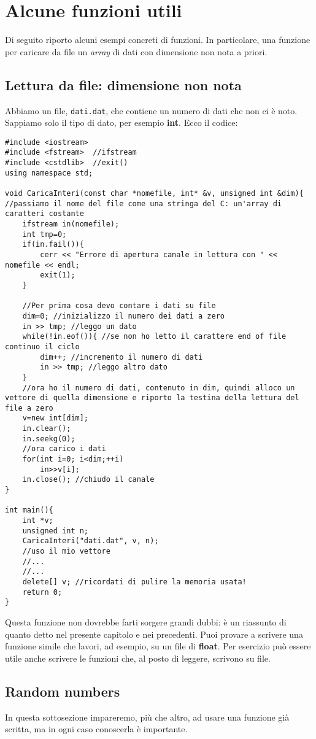 \section{Alcune funzioni utili}
Di seguito riporto alcuni esempi concreti di funzioni. In particolare, una funzione per caricare da file un \emph{array} di dati con dimensione non nota a priori.
\subsection{Lettura da file: dimensione non nota}
Abbiamo un file, \verb|dati.dat|, che contiene un numero di dati che non ci è noto. Sappiamo solo il tipo di dato, per esempio \textbf{int}. Ecco il codice:
\begin{lstlisting}
#include <iostream>
#include <fstream>	//ifstream
#include <cstdlib>	//exit()
using namespace std;

void CaricaInteri(const char *nomefile, int* &v, unsigned int &dim){ //passiamo il nome del file come una stringa del C: un'array di caratteri costante
	ifstream in(nomefile);
	int tmp=0; 
	if(in.fail()){
		cerr << "Errore di apertura canale in lettura con " << nomefile << endl;
		exit(1);
	}
	
	//Per prima cosa devo contare i dati su file
	dim=0; //inizializzo il numero dei dati a zero
	in >> tmp; //leggo un dato
	while(!in.eof()){ //se non ho letto il carattere end of file continuo il ciclo
		dim++; //incremento il numero di dati
		in >> tmp; //leggo altro dato
	}
	//ora ho il numero di dati, contenuto in dim, quindi alloco un vettore di quella dimensione e riporto la testina della lettura del file a zero
	v=new int[dim];
	in.clear();
	in.seekg(0);
	//ora carico i dati
	for(int i=0; i<dim;++i)
		in>>v[i];
	in.close(); //chiudo il canale	
}

int main(){
	int *v;
	unsigned int n;
	CaricaInteri("dati.dat", v, n);
	//uso il mio vettore
	//...
	//...
	delete[] v; //ricordati di pulire la memoria usata!
	return 0;
}
\end{lstlisting}

Questa funzione non dovrebbe farti sorgere grandi dubbi: è un riassunto di quanto detto nel presente capitolo e nei precedenti. Puoi provare a scrivere una funzione simile che lavori, ad esempio, su un file di \textbf{float}. Per esercizio può essere utile anche scrivere le funzioni che, al posto di leggere, scrivono su file.
\subsection{Random numbers}
In questa sottosezione impareremo, più che altro, ad usare una funzione già scritta, ma in ogni caso conoscerla è importante.\\

